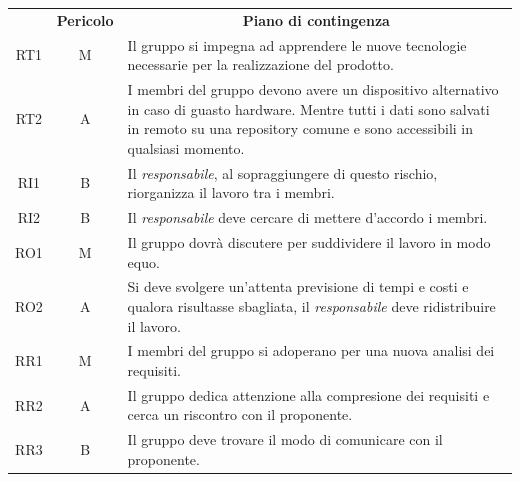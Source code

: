 \begin{table}[H]
\centering
\renewcommand{\arraystretch}{1.8}
	\begin{tabular}{c | c | p{11cm}  }
		\rowcolor[HTML]{a52a2a}
        \multicolumn{1}{c}{\color[HTML]{FFFFFF} \textbf{Codice}} &
        \multicolumn{1}{c}{\color[HTML]{FFFFFF} \textbf{Pericolo}} &
        \multicolumn{1}{c}{\color[HTML]{FFFFFF} \textbf{Piano di contingenza}} \\
	
        RT1 & M & Il gruppo si impegna ad apprendere le nuove tecnologie necessarie per la realizzazione del prodotto.\\
        RT2 & A & I membri del gruppo devono avere un dispositivo alternativo in caso di guasto hardware. 
                    Mentre tutti i dati sono salvati in remoto su una repository comune e sono accessibili in qualsiasi momento. \\
        RI1 & B & Il \textit{responsabile}, al sopraggiungere di questo rischio, riorganizza il lavoro tra i membri. \\
        RI2 & B & Il \textit{responsabile} deve cercare di mettere d'accordo i membri. \\
        RO1 & M & Il gruppo dovrà discutere per suddividere il lavoro in modo equo. \\
        RO2 & A & Si deve svolgere un'attenta previsione di tempi e costi e qualora risultasse sbagliata, il \textit{responsabile} deve ridistribuire il lavoro. \\
        RR1 & M & I membri del gruppo si adoperano per una nuova analisi dei requisiti. \\
        RR2 & A & Il gruppo dedica attenzione alla compresione dei requisiti e cerca un riscontro con il proponente. \\
        RR3 & B & Il gruppo deve trovare il modo di comunicare con il proponente. \\
        \end{tabular}
	
\end{table}

